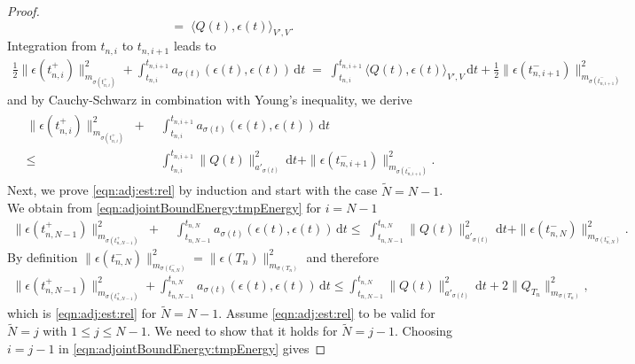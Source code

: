 \documentclass[reqno]{amsart}
\newcommand{\dt}{\,\mathrm{d}t}
\newcommand{\switch}{\sigma}
\newcommand{\nrSwitches}{N}
\newcommand{\adResidual}{Q}
\begin{document}
\begin{proof}
\begin{equation*}
		\;=\;\langle \adResidual(t), \epsilon(t)\rangle_{V',V}.
	\end{equation*}
	Integration from $t_{n,i}$ to $t_{n,i+1}$ leads to 
	\begin{align}\nonumber
		 \tfrac{1}{2}\|\epsilon(t_{n,i}^+)\|^2_{m_{\switch(t_{n,i}^+)}}+ \int_{t_{n,i}}^{t_{n,i+1}}a_{\switch(t)}(\epsilon(t),\epsilon(t))\dt
		\;=\; \int_{t_{n,i}}^{t_{n,i+1}}\langle \adResidual(t), \epsilon(t)\rangle_{V',V}\dt+\tfrac{1}{2}\|\epsilon(t_{n,i+1}^-)\|^2_{m_{\switch(t_{n,i+1}^-)}}
	\end{align}
    and by Cauchy-Schwarz in combination with Young's inequality, we derive
    \begin{align}
		\label{eqn:adjointBoundEnergy:tmpEnergy}
    \begin{aligned}
        \|\epsilon(t_{n,i}^+)\|^2_{m_{\switch(t_{n,i}^+)}}\;+&\; \int_{t_{n,i}}^{t_{n,i+1}}a_{\switch(t)}(\epsilon(t),\epsilon(t))\dt\\
		\leq&\; \int_{t_{n,i}}^{t_{n,i+1}} \|\adResidual(t)\|^2_{{a'_{\switch(t)}}}\dt+\|\epsilon(t_{n,i+1}^-)\|^2_{m_{\switch(t_{n,i+1}^-)}}.
        \end{aligned}
	\end{align}
    Next, we prove \eqref{eqn:adj:est:rel} by induction and start with the case $\tilde N = N-1$. We obtain from \eqref{eqn:adjointBoundEnergy:tmpEnergy} for $i=N-1$
    \begin{align*}
		 \|\epsilon(t_{n,N-1}^+)\|^2_{m_{\switch(t_{n,N-1}^+)}} \;+&\; \int_{t_{n,N-1}}^{t_{n,N}}a_{\switch(t)}(\epsilon(t),\epsilon(t))\dt
		\leq\; \int_{t_{n,N-1}}^{t_{n,N}}\|\adResidual(t) \|^2_{{a'_{\switch(t)}}}\dt+\|\epsilon(t_{n,N}^-)\|^2_{m_{\switch(t^{-}_{n,N})}}.
	\end{align*}
    By definition $\|\epsilon(t_{n,N}^-)\|^2_{m_{\switch(t^{-}_{n,N})}} =\|\epsilon(T_n)\|^2_{m_{\switch({T_n})}}$ and therefore
    \begin{align}\nonumber
		 \|\epsilon(t_{n,N-1}^+)\|^2_{m_{\switch(t_{n,N-1}^+)}}+ \int_{t_{n,N-1}}^{t_{n,N}}a_{\switch(t)}(\epsilon(t),\epsilon(t))\dt
		\leq \int_{t_{n,N-1}}^{t_{n,N}}\|\adResidual(t) \|^2_{{{a'_{{\switch(t)}}}}}\dt+2\|\adResidual_{T_n} \|^2_{m_{\switch({T_n})}},
	\end{align}
    which is \eqref{eqn:adj:est:rel} for $\tilde \nrSwitches= N-1$.
    Assume \eqref{eqn:adj:est:rel} to be valid for $\tilde \nrSwitches=j$ with $1\le j \le\nrSwitches-1$. We need to show that it holds for $\tilde \nrSwitches=j-1$. Choosing $i=j-1$ in \eqref{eqn:adjointBoundEnergy:tmpEnergy} gives

\end{proof}
\end{document}
